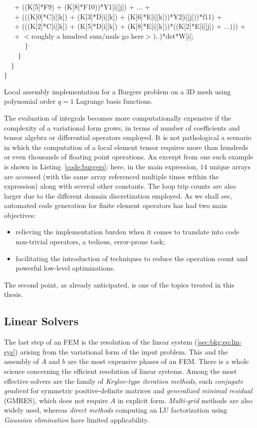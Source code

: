 \begin{algorithm}
~~~+ ((K[5]*F9) + (K[8]*F10))*Y1[i][j]) + ... + \\
~~~+ (((K[0]*C[i][k]) + (K[3]*D[i][k]) + (K[6]*E[i][k]))*Y2[i][j]))*f11) + \\
~~~+ (((K[2]*C[i][k]) + (K[5]*D[i][k]) + (K[8]*E[i][k]))*((K[2]*E[i][j]) + ...))) + \\
~~~+ $<$roughly a hundred sum/muls go here$>$)..)*det*W[i];\\
~~~~~~$\rbrace$\\
~~~~$\rbrace$\\
~~$\rbrace$ \\
$\rbrace$
\caption{Local assembly implementation for a Burgers problem on a 3D mesh using polynomial order $q=1$ Lagrange basis functions.}
\label{code:burgers}
\end{algorithm}

The evaluation of integrals becomes more computationally expensive if the complexity of a variational form grows, in terms of number of coefficients and tensor algebra or differential operators employed. It is not pathological a scenario in which the computation of a local element tensor requires more than hundreds or even thousands of floating point operations. An excerpt from one such example is shown in Listing~\ref{code:burgers}: here, in the main expression, $14$ unique arrays are accessed (with the same array referenced multiple times within the expression) along with several other constants. The loop trip counts are also larger due to the different domain discretization employed. As we shall see, automated code generation for finite element operators has had two main objectives:

\begin{itemize}
\item relieving the implementation burden when it comes to translate into code non-trivial operators, a tedious, error-prone task;
\item facilitating the introduction of techniques to reduce the operation count and powerful low-level optimizations.
\end{itemize}

The second point, as already anticipated, is one of the topics treated in this thesis.


\subsection{Linear Solvers}
\label{sec:bkg:linearsolvers}
The last step of an FEM is the resolution of the linear system (\ref{sec:bkg:eq:lin-sys}) arising from the variational form of the input problem. This and the assembly of $A$ and $b$ are the most expensive phases of an FEM. There is a whole science concerning the efficient resolution of linear systems. Among the most effective solvers are the family of {\em Krylov-type iteration methods}, such {\em conjugate gradient} for symmetric positive-definite matrices and {\em generalized minimal residual} (GMRES), which does not require $A$ in explicit form. {\em Multi-grid} methods are also widely used, whereas {\em direct methods} computing an LU factorization using {\em Gaussian elimination} have limited applicability. 

